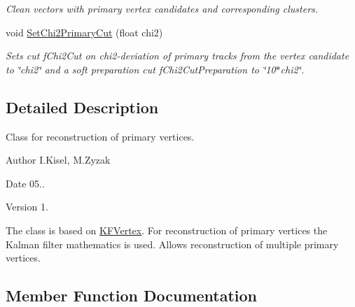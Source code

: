 \begin{DoxyCompactItemize}
\begin{DoxyCompactList}\small\item\em Clean vectors with primary vertex candidates and corresponding clusters. \end{DoxyCompactList}\item 
void \hyperlink{classKFParticlePVReconstructor_a390f47b8bd5c6fbe5a82c3cf9d473d06}{Set\+Chi2\+Primary\+Cut} (float chi2)\hypertarget{classKFParticlePVReconstructor_a390f47b8bd5c6fbe5a82c3cf9d473d06}{}\label{classKFParticlePVReconstructor_a390f47b8bd5c6fbe5a82c3cf9d473d06}

\begin{DoxyCompactList}\small\item\em Sets cut f\+Chi2\+Cut on chi2-\/deviation of primary tracks from the vertex candidate to \char`\"{}chi2\char`\"{} and a soft preparation cut f\+Chi2\+Cut\+Preparation to \char`\"{}10$\ast$chi2\char`\"{}. \end{DoxyCompactList}\end{DoxyCompactItemize}


\subsection{Detailed Description}
Class for reconstruction of primary vertices. 

\begin{DoxyAuthor}{Author}
I.\+Kisel, M.\+Zyzak 
\end{DoxyAuthor}
\begin{DoxyDate}{Date}
05.. 
\end{DoxyDate}
\begin{DoxyVersion}{Version}
1.
\end{DoxyVersion}
The class is based on \hyperlink{classKFVertex}{K\+F\+Vertex}. For reconstruction of primary vertices the Kalman filter mathematics is used. Allows reconstruction of multiple primary vertices. 

\subsection{Member Function Documentation}
